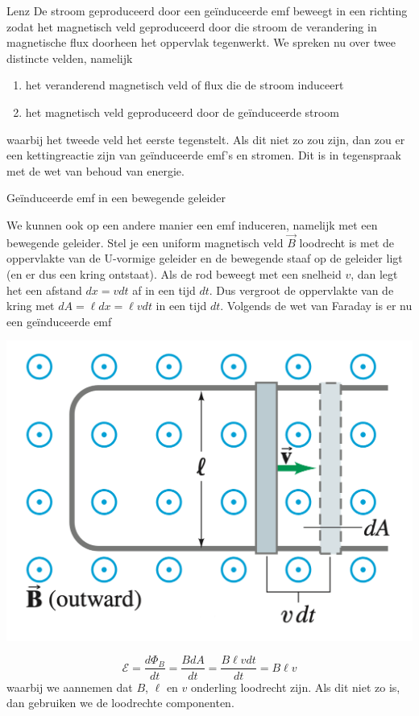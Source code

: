 \begin{lem}[Lenz]{Lenz}
    De stroom geproduceerd door een geïnduceerde emf beweegt in een richting zodat het magnetisch veld geproduceerd 
    door die stroom de verandering in magnetische flux doorheen het oppervlak tegenwerkt. We spreken nu over twee distincte velden, namelijk
    \begin{enumerate}
        \item het veranderend magnetisch veld of flux die de stroom induceert
        \item het magnetisch veld geproduceerd door de geïnduceerde stroom
    \end{enumerate}
    waarbij het tweede veld het eerste tegenstelt. Als dit niet zo zou zijn, dan zou er een kettingreactie zijn van
    geïnduceerde emf's en stromen. Dit is in tegenspraak met de wet van behoud van energie.
\end{lem}

\begin{app}{Geïnduceerde emf in een bewegende geleider}
    \begin{minipage}{.69\textwidth}
        We kunnen ook op een andere manier een emf induceren, namelijk met een bewegende geleider. Stel je een uniform magnetisch veld
        $\Vec{B}$ loodrecht is met de oppervlakte van de U-vormige geleider en de bewegende staaf op de geleider ligt (en er dus een kring 
        ontstaat). Als de rod beweegt met een snelheid $v$, dan legt het een afstand $dx = vdt$ af in een tijd $dt$.  Dus vergroot de oppervlakte
        van de kring met $dA = \ell dx = \ell v dt$ in een tijd $dt$. Volgends de wet van Faraday is er nu een geïnduceerde emf
    \end{minipage}
    \begin{minipage}{.27\textwidth}
        \includegraphics[scale = 0.23]{Images/Magnetisme/BewegendeGeleider}
    \end{minipage}
        \begin{equation*}
            \mathcal{E} = \dfrac{d\Phi_{B}}{dt} = \dfrac{BdA}{dt} = \dfrac{B\ell v dt}{dt} = B \ell v
        \end{equation*}
    waarbij we aannemen dat $B$, $\ell$ en $v$ onderling loodrecht zijn. Als dit niet zo is, dan gebruiken we de loodrechte componenten.
\end{app}

\newpage

